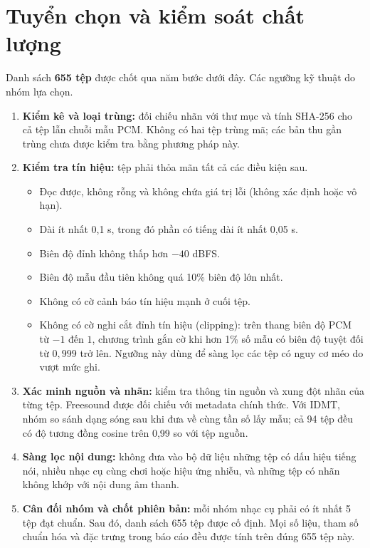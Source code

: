 \documentclass[11pt,a4paper]{article}
\begin{document}
\section{Tuyển chọn và kiểm soát chất lượng}\label{sec:curation}
Danh sách \textbf{655 tệp} được chốt qua năm bước dưới đây. Các ngưỡng kỹ thuật do nhóm lựa chọn.
\begin{enumerate}
\item \textbf{Kiểm kê và loại trùng:} đối chiếu nhãn với thư mục và tính SHA-256 cho cả tệp lẫn chuỗi mẫu PCM. Không có hai tệp trùng mã; các bản thu gần trùng chưa được kiểm tra bằng phương pháp này.
\item \textbf{Kiểm tra tín hiệu:} tệp phải thỏa mãn tất cả các điều kiện sau.
\begin{itemize}
\item Đọc được, không rỗng và không chứa giá trị lỗi (không xác định hoặc vô hạn).
\item Dài ít nhất 0,1 s, trong đó phần có tiếng dài ít nhất 0,05 s.
\item Biên độ đỉnh không thấp hơn $-40$ dBFS.
\item Biên độ mẫu đầu tiên không quá 10\% biên độ lớn nhất.
\item Không có cờ cảnh báo tín hiệu mạnh ở cuối tệp.
\item Không có cờ nghi cắt đỉnh tín hiệu (clipping): trên thang biên độ PCM từ $-1$ đến $1$, chương trình gắn cờ khi hơn 1\% số mẫu có biên độ tuyệt đối từ $0{,}999$ trở lên. Ngưỡng này dùng để sàng lọc các tệp có nguy cơ méo do vượt mức ghi.
\end{itemize}
\item \textbf{Xác minh nguồn và nhãn:} kiểm tra thông tin nguồn và xung đột nhãn của từng tệp. Freesound được đối chiếu với metadata chính thức. Với IDMT, nhóm so sánh dạng sóng sau khi đưa về cùng tần số lấy mẫu; cả 94 tệp đều có độ tương đồng cosine trên 0,99 so với tệp nguồn.
\item \textbf{Sàng lọc nội dung:} không đưa vào bộ dữ liệu những tệp có dấu hiệu tiếng nói, nhiều nhạc cụ cùng chơi hoặc hiệu ứng nhiễu, và những tệp có nhãn không khớp với nội dung âm thanh.
\item \textbf{Cân đối nhóm và chốt phiên bản:} mỗi nhóm nhạc cụ phải có ít nhất 5 tệp đạt chuẩn. Sau đó, danh sách 655 tệp được cố định. Mọi số liệu, tham số chuẩn hóa và đặc trưng trong báo cáo đều được tính trên đúng 655 tệp này.
\end{enumerate}
\end{document}
